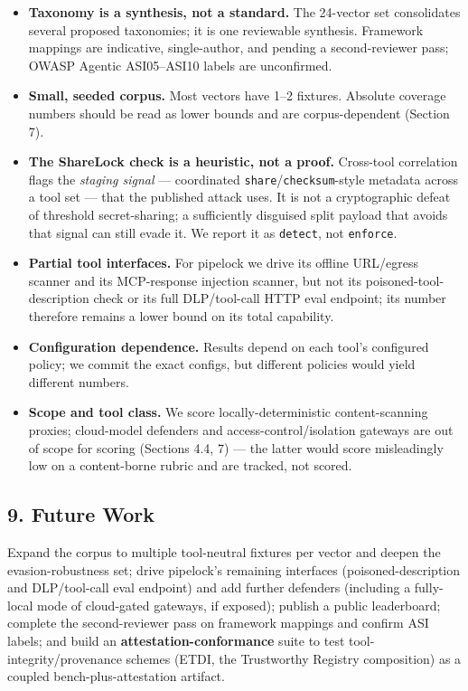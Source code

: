 \documentclass[
]{article}
\providecommand{\tightlist}{%
  \setlength{\itemsep}{0pt}\setlength{\parskip}{0pt}}
\begin{document}
\begin{itemize}
\tightlist
\item
  \textbf{Taxonomy is a synthesis, not a standard.} The 24-vector set
  consolidates several proposed taxonomies; it is one reviewable
  synthesis. Framework mappings are indicative, single-author, and
  pending a second-reviewer pass; OWASP Agentic ASI05--ASI10 labels are
  unconfirmed.
\item
  \textbf{Small, seeded corpus.} Most vectors have 1--2 fixtures.
  Absolute coverage numbers should be read as lower bounds and are
  corpus-dependent (Section 7).
\item
  \textbf{The ShareLock check is a heuristic, not a proof.} Cross-tool
  correlation flags the \emph{staging signal} --- coordinated
  \texttt{share}/\texttt{checksum}-style metadata across a tool set ---
  that the published attack uses. It is not a cryptographic defeat of
  threshold secret-sharing; a sufficiently disguised split payload that
  avoids that signal can still evade it. We report it as
  \texttt{detect}, not \texttt{enforce}.
\item
  \textbf{Partial tool interfaces.} For pipelock we drive its offline
  URL/egress scanner and its MCP-response injection scanner, but not its
  poisoned-tool-description check or its full DLP/tool-call HTTP eval
  endpoint; its number therefore remains a lower bound on its total
  capability.
\item
  \textbf{Configuration dependence.} Results depend on each tool's
  configured policy; we commit the exact configs, but different policies
  would yield different numbers.
\item
  \textbf{Scope and tool class.} We score locally-deterministic
  content-scanning proxies; cloud-model defenders and
  access-control/isolation gateways are out of scope for scoring
  (Sections 4.4, 7) --- the latter would score misleadingly low on a
  content-borne rubric and are tracked, not scored.
\end{itemize}

\subsection{9. Future Work}\label{future-work}

Expand the corpus to multiple tool-neutral fixtures per vector and
deepen the evasion-robustness set; drive pipelock's remaining interfaces
(poisoned-description and DLP/tool-call eval endpoint) and add further
defenders (including a fully-local mode of cloud-gated gateways, if
exposed); publish a public leaderboard; complete the second-reviewer
pass on framework mappings and confirm ASI labels; and build an
\textbf{attestation-conformance} suite to test tool-integrity/provenance
schemes (ETDI, the Trustworthy Registry composition) as a coupled
bench-plus-attestation artifact.
\end{document}
